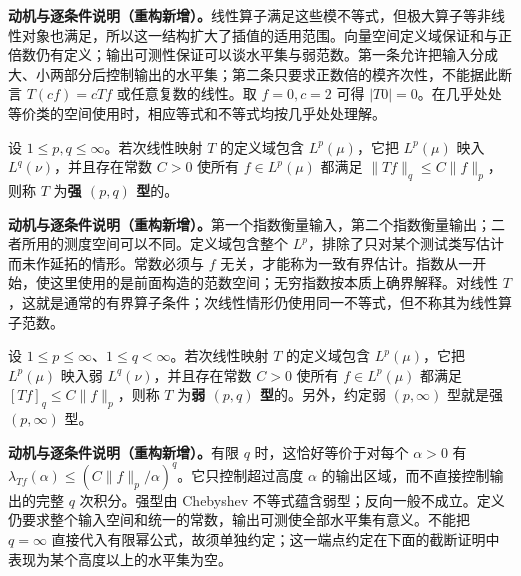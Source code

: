 \documentclass[../../main.tex]{subfiles}
\begin{document}
\begin{remark}
\textbf{动机与逐条件说明（重构新增）。}线性算子满足这些模不等式，但极大算子等非线性对象也满足，所以这一结构扩大了插值的适用范围。向量空间定义域保证和与正倍数仍有定义；输出可测性保证可以谈水平集与弱范数。第一条允许把输入分成大、小两部分后控制输出的水平集；第二条只要求正数倍的模齐次性，不能据此断言 $T(cf)=cTf$ 或任意复数的线性。取 $f=0,c=2$ 可得 $|T0|=0$。在几乎处处等价类的空间使用时，相应等式和不等式均按几乎处处理解。
\end{remark}
\begin{definition}[强型]\label{definition:ch06-strong-type}
设 $1\leqslant p,q\leqslant\infty$。若次线性映射 $T$ 的定义域包含 $L^p(\mu)$，它把 $L^p(\mu)$ 映入 $L^q(\nu)$，并且存在常数 $C>0$ 使所有 $f\in L^p(\mu)$ 都满足 $\|Tf\|_q\leqslant C\|f\|_p$，则称 $T$ 为\textbf{强 $(p,q)$ 型}的。
\end{definition}
\begin{remark}
\textbf{动机与逐条件说明（重构新增）。}第一个指数衡量输入，第二个指数衡量输出；二者所用的测度空间可以不同。定义域包含整个 $L^p$，排除了只对某个测试类写估计而未作延拓的情形。常数必须与 $f$ 无关，才能称为一致有界估计。指数从一开始，使这里使用的是前面构造的范数空间；无穷指数按本质上确界解释。对线性 $T$，这就是通常的有界算子条件；次线性情形仍使用同一不等式，但不称其为线性算子范数。
\end{remark}
\begin{definition}[弱型]\label{definition:ch06-weak-type}
设 $1\leqslant p\leqslant\infty$、$1\leqslant q<\infty$。若次线性映射 $T$ 的定义域包含 $L^p(\mu)$，它把 $L^p(\mu)$ 映入弱 $L^q(\nu)$，并且存在常数 $C>0$ 使所有 $f\in L^p(\mu)$ 都满足 $[Tf]_q\leqslant C\|f\|_p$，则称 $T$ 为\textbf{弱 $(p,q)$ 型}的。另外，约定弱 $(p,\infty)$ 型就是强 $(p,\infty)$ 型。
\end{definition}
\begin{remark}
\textbf{动机与逐条件说明（重构新增）。}有限 $q$ 时，这恰好等价于对每个 $\alpha>0$ 有 $\lambda_{Tf}(\alpha)\leqslant(C\|f\|_p/\alpha)^q$。它只控制超过高度 $\alpha$ 的输出区域，而不直接控制输出的完整 $q$ 次积分。强型由 Chebyshev 不等式蕴含弱型；反向一般不成立。定义仍要求整个输入空间和统一的常数，输出可测使全部水平集有意义。不能把 $q=\infty$ 直接代入有限幂公式，故须单独约定；这一端点约定在下面的截断证明中表现为某个高度以上的水平集为空。
\end{remark}



\end{document}
